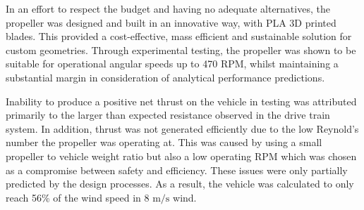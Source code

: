 In an effort to respect the budget and having no adequate alternatives, the propeller was designed and built in an innovative way, with PLA 3D printed blades. This provided a cost-effective, mass efficient and sustainable solution for custom geometries. Through experimental testing, the propeller was shown to be suitable for operational angular speeds up to 470 RPM, whilst maintaining a substantial margin in consideration of analytical performance predictions.

Inability to produce a positive net thrust on the vehicle in testing was attributed primarily to the larger than expected resistance observed in the drive train system. In addition, thrust was not generated efficiently due to the low Reynold's number the propeller was operating at. This was caused by using a small propeller to vehicle weight ratio but also a low operating RPM which was chosen as a compromise between safety and efficiency. These issues were only partially predicted by the design processes. As a result, the vehicle was calculated to only reach 56\% of the wind speed in 8 $\mathrm{m/s}$ wind.


